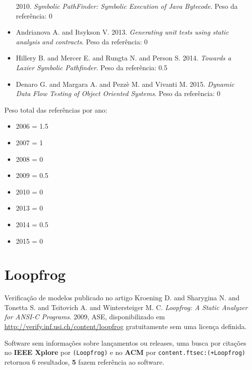 \begin{itemize}
      2010.
      {\it Symbolic PathFinder: Symbolic Execution of Java Bytecode}.
      Peso da referência: 0
\item Andrianova A. and Itsykson V.
      2013.
      {\it Generating unit tests using static analysis and contracts}.
      Peso da referência: 0
\item Hillery B. and Mercer E. and Rungta N. and Person S.
      2014.
      {\it Towards a Lazier Symbolic Pathfinder}.
      Peso da referência: 0.5
\item Denaro G. and Margara A. and Pezz\`{e} M. and Vivanti M.
      2015.
      {\it Dynamic Data Flow Testing of Object Oriented Systems}.
      Peso da referência: 0
\end{itemize}

Peso total das referências por ano:

\begin{itemize}
\item 2006 = 1.5
\item 2007 = 1
\item 2008 = 0
\item 2009 = 0.5
\item 2010 = 0
\item 2013 = 0
\item 2014 = 0.5
\item 2015 = 0
\end{itemize}


\section{Loopfrog}

Verificação de modelos
publicado no artigo
Kroening D. and Sharygina N. and Tonetta S. and Tsitovich A. and Wintersteiger M. C.
{\it Loopfrog: A Static Analyzer for ANSI-C Programs}.
2009,
ASE,
disponibilizado em \url{http://verify.inf.usi.ch/content/loopfrog}
gratuitamente
sem uma licença definida.

Software sem informações sobre lançamentos ou releases,
uma busca por citações no {\bf IEEE Xplore} por
\texttt{(Loopfrog)}
e no {\bf ACM} por
\texttt{content.ftsec:(+Loopfrog)}
retornou
6 resultados,
{\bf 5} fazem referência ao software.

